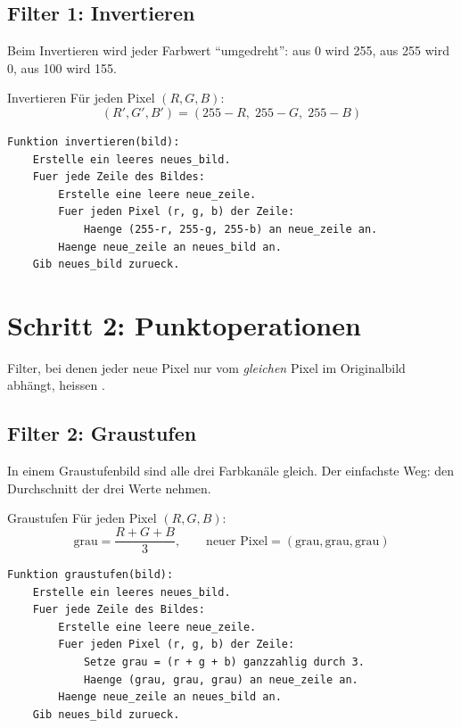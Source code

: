 \subsection*{Filter 1: Invertieren}

Beim Invertieren wird jeder Farbwert ``umgedreht'': aus 0 wird 255, aus 255
wird 0, aus 100 wird 155.

\begin{definitionbox}{Invertieren}
F\"ur jeden Pixel $(R, G, B)$:
\[ (R', G', B') = (255 - R,\; 255 - G,\; 255 - B) \]
\end{definitionbox}

\begin{lstlisting}[style=pseudo]
Funktion invertieren(bild):
    Erstelle ein leeres neues_bild.
    Fuer jede Zeile des Bildes:
        Erstelle eine leere neue_zeile.
        Fuer jeden Pixel (r, g, b) der Zeile:
            Haenge (255-r, 255-g, 255-b) an neue_zeile an.
        Haenge neue_zeile an neues_bild an.
    Gib neues_bild zurueck.
\end{lstlisting}


\section{Schritt 2: Punktoperationen}

Filter, bei denen jeder neue Pixel nur vom \textit{gleichen} Pixel im
Originalbild abh\"angt, heissen .

\subsection*{Filter 2: Graustufen}

In einem Graustufenbild sind alle drei Farbkan\"ale gleich. Der einfachste
Weg: den Durchschnitt der drei Werte nehmen.

\begin{definitionbox}{Graustufen}
F\"ur jeden Pixel $(R, G, B)$:
\[ \text{grau} = \frac{R + G + B}{3}, \qquad
   \text{neuer Pixel} = (\text{grau}, \text{grau}, \text{grau}) \]
\end{definitionbox}

\begin{lstlisting}[style=pseudo]
Funktion graustufen(bild):
    Erstelle ein leeres neues_bild.
    Fuer jede Zeile des Bildes:
        Erstelle eine leere neue_zeile.
        Fuer jeden Pixel (r, g, b) der Zeile:
            Setze grau = (r + g + b) ganzzahlig durch 3.
            Haenge (grau, grau, grau) an neue_zeile an.
        Haenge neue_zeile an neues_bild an.
    Gib neues_bild zurueck.
\end{lstlisting}

